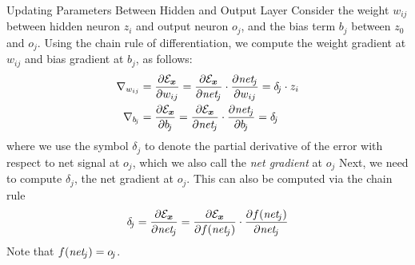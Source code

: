 \begin{frame}{Updating Parameters Between Hidden and Output Layer}
%
Consider the weight $w_{ij}$ between hidden neuron $z_i$ and
output neuron $o_{\!j}$, and the bias term $b_{\!j}$
between $z_0$ and $o_{\!j}$. 
Using the chain rule of differentiation, we
compute the weight gradient at $w_{ij}$ and bias gradient at
$b_{\!j}$, as
follows:
\begin{align}
    \label{eq:reg:neural:gradwij}
    \begin{aligned}
    \grad_{w_{ij}} & = 
 \frac{\partial \cE_\bx}{\partial w_{ij}}
     = \frac{\partial \cE_\bx}{\partial \net_{\!j}} \cdot 
    \frac{\partial \net_{\!j}}{\partial w_{ij}}
    = \delta_{\!j}  \cdot z_i\\
    \grad_{b_{\!j}} & = 
 \frac{\partial \cE_\bx}{\partial b_{\!j}}
     = \frac{\partial \cE_\bx}{\partial \net_{\!j}} \cdot 
    \frac{\partial \net_{\!j}}{\partial b_{\!j}}
    = \delta_{\!j}
\end{aligned}
\end{align}
where we use the symbol $\delta_{\!j}$ to denote the partial derivative of
the error with respect to net signal at $o_{\!j}$, which we also call the
{\em net gradient} at $o_{\!j}$
%
Next, we need to compute $\delta_{\!j}$, the net gradient at
$o_{\!j}$. This can also be computed via
the chain rule
\begin{align}
    \delta_{\!j} = \frac{\partial {\mathcal E}_{\boldsymbol x}}{\partial \mathit{net}_{\!j}} =
   \frac{\partial {\mathcal E}_{\boldsymbol x}}{\partial f(\mathit{net}_{\!j})} \cdot
\frac{\partial f(\mathit{net}_{\!j})}{\partial \mathit{net}_{\!j}}
\label{eq:reg:neural:deltaj_chain}
\end{align}
Note that $f(\mathit{net}_{\!j}) = o_{\!j}$.
\end{frame}

